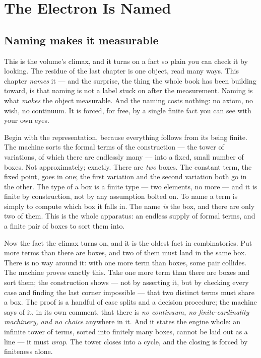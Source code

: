 \chapter{The Electron Is Named}

\section{Naming makes it measurable}

This is the volume's climax, and it turns on a fact so plain you can check it by looking. The residue of the last
chapter is one object, read many ways. This chapter \emph{names} it --- and the surprise, the thing the whole book has
been building toward, is that naming is not a label stuck on after the measurement. Naming is what \emph{makes} the
object measurable. And the naming costs nothing: no axiom, no wish, no continuum. It is forced, for free, by a single
finite fact you can see with your own eyes.

Begin with the representation, because everything follows from its being finite. The machine sorts the formal terms of
the construction --- the tower of variations, of which there are endlessly many --- into a fixed, small number of
boxes. Not approximately; exactly. There are \emph{two} boxes. The constant term, the fixed point, goes in one; the
first variation and the second variation both go in the other. The type of a box is a finite type --- two elements, no
more --- and it is finite by construction, not by any assumption bolted on. To name a term is simply to compute which
box it falls in. The name \emph{is} the box, and there are only two of them. This is the whole apparatus: an endless
supply of formal terms, and a finite pair of boxes to sort them into.

Now the fact the climax turns on, and it is the oldest fact in combinatorics. Put more terms than there are boxes, and
two of them must land in the same box. There is no way around it: with one more term than boxes, some pair collides.
The machine proves exactly this. Take one more term than there are boxes and sort them; the construction shows --- not
by asserting it, but by checking every case and finding the last corner impossible --- that two distinct terms must
share a box. The proof is a handful of case splits and a decision procedure; the machine says of it, in its own
comment, that there is \emph{no continuum, no finite-cardinality machinery, and no choice} anywhere in it. And it
states the engine whole: an infinite tower of terms, sorted into finitely many boxes, cannot be laid out as a line ---
it must \emph{wrap}. The tower closes into a cycle, and the closing is forced by finiteness alone.

